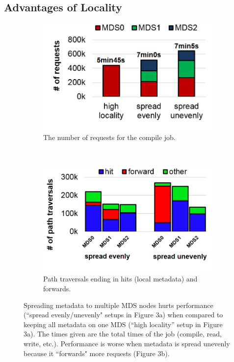 \subsection{Advantages of Locality}
\label{advantages_of_locality}
\begin{figure}[tbh]
	\begin{subfigure}[H]{0.45\textwidth}
		\centering	
	\caption{The number of requests for the compile job.  \label{figure:workload-tar-requests-total}}
		
\includegraphics[width=1\textwidth]{./chapters/mantle/figures/workload-tar-requests2.png}
	\end{subfigure}
	~
	\begin{subfigure}[H]{0.47\textwidth}
		\centering
		\caption{Path traversals ending in hits (local metadata) and forwards. \label{figure:workload-tar-traverses}}	
	\includegraphics[width=1\textwidth]{./chapters/mantle/figures/workload-tar-traverses2.png}
	\end{subfigure}	
	\caption{Spreading metadata to multiple MDS nodes hurts performance (``spread evenly/unevenly" setups in Figure 3a) when compared to keeping all metadata on one MDS (``high locality'' setup in Figure 3a). The times given are the total times of the job (compile, read, write, etc.). Performance is worse when metadata is spread unevenly because it ``forwards" more requests (Figure 3b).\label{figure:workload-tar-requests}}
\end{figure}

